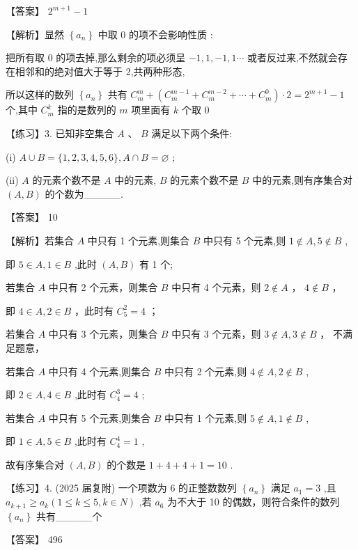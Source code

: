 \documentclass[10pt]{article}
\newcommand*\circled[1]{\tikz[baseline=(char.base)]{\node[shape=circle,draw,inner sep=1.5pt] (char) {\small #1};}}
\begin{document}
【答案】 \({2}^{m + 1} - 1\)

【解析】显然 \(\left\{  {a}_{n}\right\}\) 中取 0 的项不会影响性质 \circled{2} :

把所有取 0 的项去掉,那么剩余的项必须呈 \(- 1,1, - 1,1\cdots\) 或者反过来,不然就会存在相邻和的绝对值大于等于 2,共两种形态,

所以这样的数列 \(\left\{  {a}_{n}\right\}\) 共有 \({C}_{m}^{m} + \left( {{C}_{m}^{m - 1} + {C}_{m}^{m - 2} + \cdots  + {C}_{m}^{0}}\right)  \cdot  2 = {2}^{m + 1} - 1\) 个,其中 \({C}_{m}^{k}\) 指的是数列的 \(m\) 项里面有 \(k\) 个取 0

【练习】3. 已知非空集合 \(A\text{ 、 }B\) 满足以下两个条件:

(i) \(A \cup  B = \{ 1,2,3,4,5,6\} ,A \cap  B = \varnothing\) ;

(ii) \(A\) 的元素个数不是 \(A\) 中的元素, \(B\) 的元素个数不是 \(B\) 中的元素,则有序集合对 \(\left( {A,B}\right)\) 的个数为\_\_\_\_\_.

【答案】 10

【解析】若集合 \(A\) 中只有 1 个元素,则集合 \(B\) 中只有 5 个元素,则 \(1 \notin  A,5 \notin  B\) ,

即 \(5 \in  A,1 \in  B\) ,此时 \(\left( {A,B}\right)\) 有 1 个;

若集合 \(A\) 中只有 2 个元素，则集合 \(B\) 中只有 4 个元素，则 \(2 \notin  A\) ， \(4 \notin  B\) ，

即 \(4 \in  A,2 \in  B\) ，此时有 \({C}_{5}^{2} = 4\) ；

若集合 \(A\) 中只有 3 个元素，则集合 \(B\) 中只有 3 个元素，则 \(3 \notin  A,3 \notin  B\) ， 不满足题意，

若集合 \(A\) 中只有 4 个元素,则集合 \(B\) 中只有 2 个元素,则 \(4 \notin  A,2 \notin  B\) ,

即 \(2 \in  A,4 \in  B\) ,此时有 \({C}_{4}^{3} = 4\) ;

若集合 \(A\) 中只有 5 个元素,则集合 \(B\) 中只有 1 个元素,则 \(5 \notin  A,1 \notin  B\) ,

即 \(1 \in  A,5 \in  B\) ,此时有 \({C}_{4}^{4} = 1\) ,

故有序集合对 \(\left( {A,B}\right)\) 的个数是 \(1 + 4 + 4 + 1 = {10}\) .

【练习】4. (2025 届复附) 一个项数为 6 的正整数数列 \(\left\{  {a}_{n}\right\}\) 满足 \({a}_{1} = 3\) ,且 \({a}_{k + 1} \geq  {a}_{k}\left( {1 \leq  k \leq  5,k \in  N}\right)\) ,若 \({a}_{6}\) 为不大于 10 的偶数，则符合条件的数列 \(\left\{  {a}_{n}\right\}\) 共有\_\_\_\_\_个

【答案】 496
\end{document}
